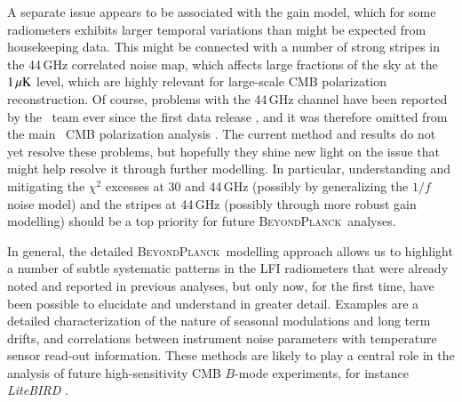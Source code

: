 \documentclass[twocolumn]{aa}
\newcommand{\BP}{\textsc{BeyondPlanck}}
\begin{document}
A separate issue appears to be associated with the gain model, which
for some radiometers exhibits larger temporal variations than might be
expected from housekeeping data. This might be connected with a number
of strong stripes in the 44\,GHz correlated noise map, which affects
large fractions of the sky at the $1\muK$ level, which are highly
relevant for large-scale CMB polarization reconstruction. Of course,
problems with the 44\,GHz channel have been reported by the
\Planck\ team ever since the first data release
\citep{planck2013-p03,planck2014-a02,planck2016-l02}, and it was
therefore omitted from the main \Planck\ CMB polarization analysis
\citep{planck2016-l04}. The current method and results do not yet
resolve these problems, but hopefully they shine new light on the
issue that might help resolve it through further modelling. In
particular, understanding and mitigating the $\chi^2$ excesses at 30
and 44\,GHz (possibly by generalizing the $1/f$ noise model) and the
stripes at 44\,GHz (possibly through more robust gain modelling)
should be a top priority for future \BP\ analyses.

In general, the detailed \BP\ modelling approach allows us to
highlight a number of subtle systematic patterns in the LFI
radiometers that were already noted and reported in previous analyses,
but only now, for the first time, have been possible to elucidate and
understand in greater detail. Examples are a detailed characterization
of the nature of seasonal modulations and long term drifts, and
correlations between instrument noise parameters with temperature
sensor read-out information. These methods are likely to play a
central role in the analysis of future high-sensitivity CMB $B$-mode
experiments, for instance \textit{LiteBIRD} \citep{litebird2020}.






\end{document}

